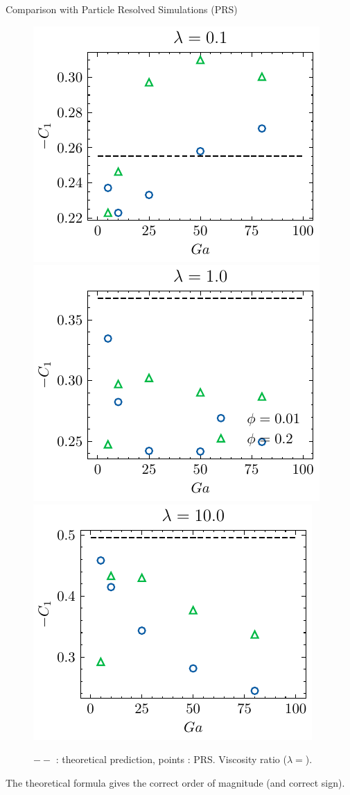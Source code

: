 \documentclass{sintefbeamer}
\begin{document}
\begin{frame}{Comparison with Particle Resolved Simulations (PRS)}
  \begin{figure}[h!]
    \centering
    \includegraphics[height = 0.25\textwidth]{image/HOMOGENEOUS_final/PA/Sdev_diapo2_l_1.pdf}
    \includegraphics[height = 0.25\textwidth]{image/HOMOGENEOUS_final/PA/Sdev_diapo2_l_10.pdf}
    \includegraphics[height = 0.25\textwidth]{image/HOMOGENEOUS_final/PA/Sdev_diapo2_l_100.pdf}
    \caption{$--$ : theoretical prediction, points : PRS.  Viscosity ratio ($\lambda =$). 
     }
\end{figure}

The theoretical formula gives the correct order of magnitude (and correct sign).


\end{frame}
\end{document}
